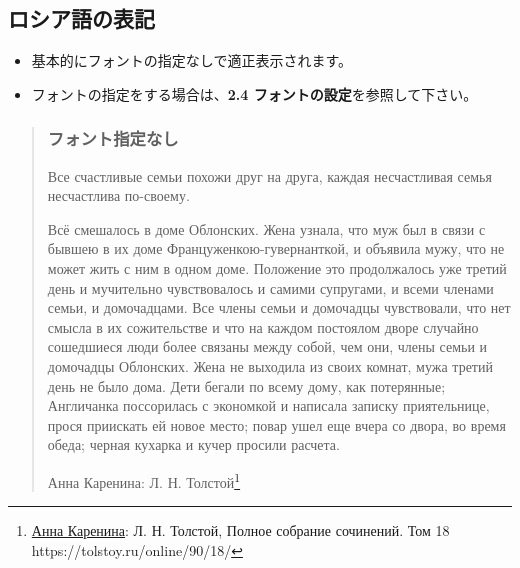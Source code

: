 \documentclass[a4paper,12pt]{ltjsarticle}
\begin{document}
\newpage

\subsection{ロシア語の表記}
\begin{itemize}
  \item 基本的にフォントの指定なしで適正表示されます。
  \item フォントの指定をする場合は、\textbf{2.4 フォントの設定}を参照して下さい。\vspace{-8mm}
\end{itemize}

\begin{quote}
\subsubsection*{フォント指定なし}
\quad Все счастливые семьи похожи друг на друга, каждая несчастливая семья несчастлива по-своему.\par
\quad Всё смешалось в доме Облонских. Жена узнала, что муж был в связи с бывшею в их доме Француженкою-гувернанткой, и объявила мужу, что не может жить с ним в одном доме. Положение это продолжалось уже третий день и мучительно чувствовалось и самими супругами, и всеми членами семьи, и домочадцами. Все члены семьи и домочадцы чувствовали, что нет смысла в их сожительстве и что на каждом постоялом дворе случайно сошедшиеся люди более связаны между собой, чем они, члены семьи и домочадцы Облонских. Жена не выходила из своих комнат, мужа третий день не было дома. Дети бегали по всему дому, как потерянные; Англичанка поссорилась с экономкой и написала записку приятельнице, прося приискать ей новое место; повар ушел еще вчера со двора, во время обеда; черная кухарка и кучер просили расчета.\par
\hspace{76mm}Анна Каренина: Л. Н. Толстой\footnote{\href{https://tolstoy.ru/online/90/18/}{Анна Каренина}: Л. Н. Толстой, Полное собрание сочинений. Том 18\\https://tolstoy.ru/online/90/18/}\par
\vspace{-6mm}


\end{quote}
\end{document}

